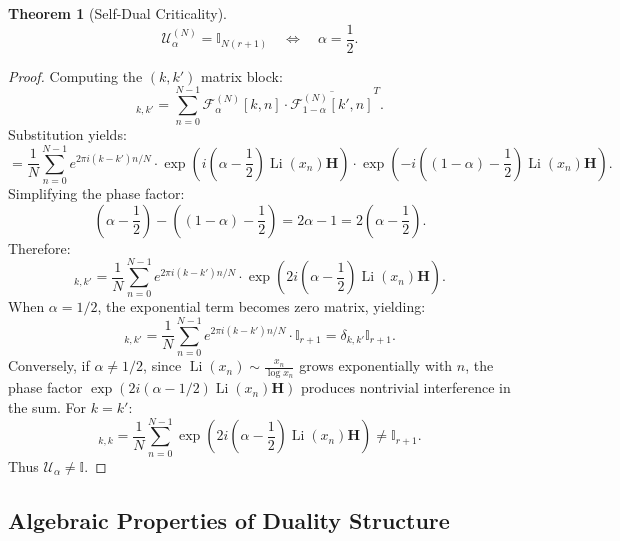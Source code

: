 \documentclass[12pt,a4paper]{amsart}
\theoremstyle{plain}
\newtheorem{theorem}{Theorem}[section]
\theoremstyle{definition}
\theoremstyle{remark}
\DeclareMathOperator{\Li}{Li}
\begin{document}
\begin{theorem}[Self-Dual Criticality]\label{thm:selfdual}
\begin{equation}
\mathcal{U}_\alpha^{(N)} = \mathbb{I}_{N(r+1)} \quad \Leftrightarrow \quad \alpha = \frac{1}{2}.
\end{equation}
\end{theorem}

\begin{proof}
Computing the $(k,k')$ matrix block:
\begin{equation}
[\mathcal{U}_\alpha]_{k,k'} = \sum_{n=0}^{N-1} \mathcal{F}_\alpha^{(N)}[k,n] \cdot \overline{\mathcal{F}_{1-\alpha}^{(N)}[k',n]}^T.
\end{equation}
Substitution yields:
\begin{equation}
= \frac{1}{N}\sum_{n=0}^{N-1} e^{2\pi i(k-k')n/N} \cdot \exp\left(i\left(\alpha-\frac{1}{2}\right)\Li(x_n)\mathbf{H}\right) \cdot \exp\left(-i\left((1-\alpha)-\frac{1}{2}\right)\Li(x_n)\mathbf{H}\right).
\end{equation}
Simplifying the phase factor:
\begin{equation}
\left(\alpha-\frac{1}{2}\right) - \left((1-\alpha)-\frac{1}{2}\right) = 2\alpha - 1 = 2\left(\alpha-\frac{1}{2}\right).
\end{equation}
Therefore:
\begin{equation}
[\mathcal{U}_\alpha]_{k,k'} = \frac{1}{N}\sum_{n=0}^{N-1} e^{2\pi i(k-k')n/N} \cdot \exp\left(2i\left(\alpha-\frac{1}{2}\right)\Li(x_n)\mathbf{H}\right).
\end{equation}
When $\alpha = 1/2$, the exponential term becomes zero matrix, yielding:
\begin{equation}
[\mathcal{U}_{1/2}]_{k,k'} = \frac{1}{N}\sum_{n=0}^{N-1} e^{2\pi i(k-k')n/N} \cdot \mathbb{I}_{r+1} = \delta_{k,k'}\mathbb{I}_{r+1}.
\end{equation}
Conversely, if $\alpha \neq 1/2$, since $\Li(x_n) \sim \frac{x_n}{\log x_n}$ grows exponentially with $n$, the phase factor $\exp(2i(\alpha-1/2)\Li(x_n)\mathbf{H})$ produces nontrivial interference in the sum. For $k=k'$:
\begin{equation}
[\mathcal{U}_\alpha]_{k,k} = \frac{1}{N}\sum_{n=0}^{N-1} \exp\left(2i\left(\alpha-\frac{1}{2}\right)\Li(x_n)\mathbf{H}\right) \neq \mathbb{I}_{r+1}.
\end{equation}
Thus $\mathcal{U}_\alpha \neq \mathbb{I}$.
\end{proof}

\subsection{Algebraic Properties of Duality Structure}
\end{document}

